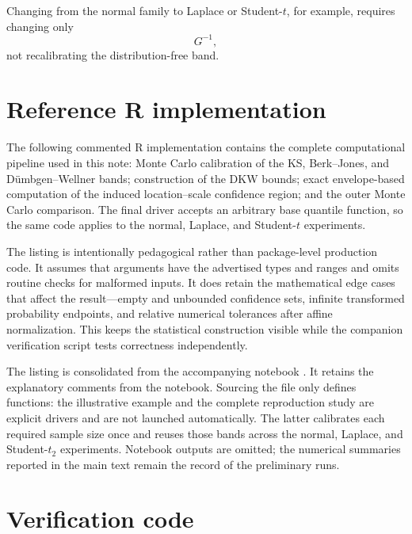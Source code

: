 \documentclass[11pt]{article}
\begin{document}
Changing from the normal family to Laplace or Student-$t$, for example,
requires changing only
\[
    G^{-1},
\]
not recalibrating the distribution-free band.


\section{Reference R implementation}
\label{app:Rcode}

The following commented R implementation contains the complete
computational pipeline used in this note: Monte Carlo calibration of the
KS, Berk--Jones, and D\"umbgen--Wellner bands; construction of the DKW
bounds; exact envelope-based computation of the induced location--scale
confidence region; and the outer Monte Carlo comparison.  The final
driver accepts an arbitrary base quantile function, so the same code
applies to the normal, Laplace, and Student-$t$ experiments.

The listing is intentionally pedagogical rather than package-level
production code.  It assumes that arguments have the advertised types
and ranges and omits routine checks for malformed inputs.  It does retain
the mathematical edge cases that affect the result---empty and
unbounded confidence sets, infinite transformed probability endpoints,
and relative numerical tolerances after affine normalization.  This
keeps the statistical construction visible while the companion
verification script tests correctness independently.

The listing is consolidated from the accompanying notebook
.  It retains the explanatory
comments from the notebook.  Sourcing the file only defines functions:
the illustrative example and the complete reproduction study are
explicit drivers and are not launched automatically.  The latter
calibrates each required sample size once and reuses those bands across
the normal, Laplace, and Student-$t_2$ experiments.  Notebook outputs are
omitted; the numerical summaries reported in the main text remain the
record of the preliminary runs.




\section{Verification code}
\label{app:Rchecks}
\end{document}
